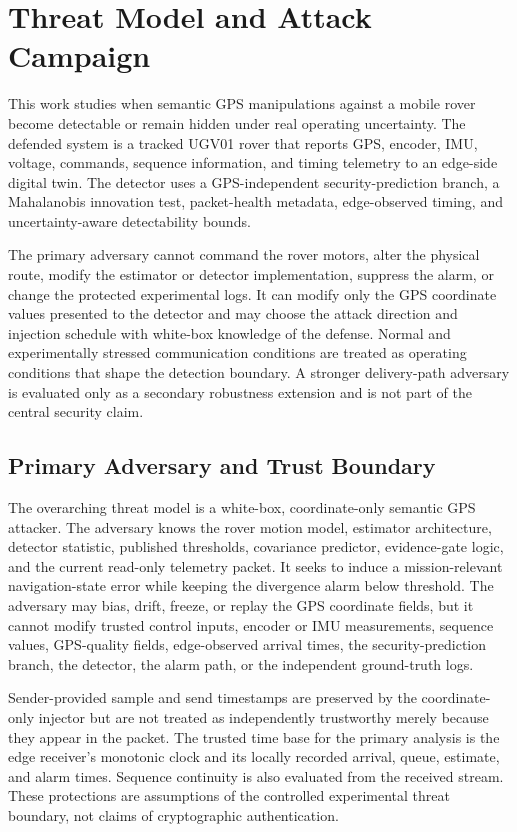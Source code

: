 \documentclass[11pt,a4paper]{article}
\begin{document}
\section{Threat Model and Attack Campaign}
\label{sec:threat-model}

This work studies when semantic GPS manipulations against a mobile rover become
detectable or remain hidden under real operating uncertainty. The defended
system is a tracked UGV01 rover that reports GPS, encoder, IMU, voltage,
commands, sequence information, and timing telemetry to an edge-side digital
twin. The detector uses a GPS-independent security-prediction branch, a
Mahalanobis innovation test, packet-health metadata, edge-observed timing, and
uncertainty-aware detectability bounds.

The primary adversary cannot command the rover motors, alter the physical
route, modify the estimator or detector implementation, suppress the alarm, or
change the protected experimental logs. It can modify only the GPS coordinate
values presented to the detector and may choose the attack direction and
injection schedule with white-box knowledge of the defense. Normal and
experimentally stressed communication conditions are treated as operating
conditions that shape the detection boundary. A stronger delivery-path
adversary is evaluated only as a secondary robustness extension and is not part
of the central security claim.

\subsection{Primary Adversary and Trust Boundary}

The overarching threat model is a white-box, coordinate-only semantic GPS
attacker. The adversary knows the rover motion model, estimator architecture,
detector statistic, published thresholds, covariance predictor, evidence-gate
logic, and the current read-only telemetry packet. It seeks to induce a
mission-relevant navigation-state error while keeping the divergence alarm
below threshold. The adversary may bias, drift, freeze, or replay the GPS
coordinate fields, but it cannot modify trusted control inputs, encoder or IMU
measurements, sequence values, GPS-quality fields, edge-observed arrival times,
the security-prediction branch, the detector, the alarm path, or the
independent ground-truth logs.

Sender-provided sample and send timestamps are preserved by the coordinate-only
injector but are not treated as independently trustworthy merely because they
appear in the packet. The trusted time base for the primary analysis is the
edge receiver's monotonic clock and its locally recorded arrival, queue,
estimate, and alarm times. Sequence continuity is also evaluated from the
received stream. These protections are assumptions of the controlled
experimental threat boundary, not claims of cryptographic authentication.
\end{document}
